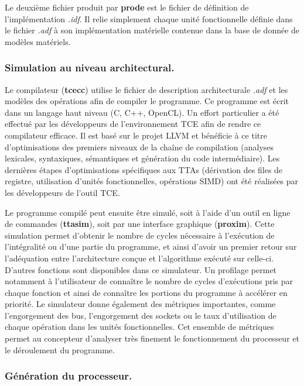 Le deuxième fichier produit par \textbf{prode} est le fichier de définition de l'implémentation \textit{.idf}. Il relie simplement chaque unité fonctionnelle définie dans le fichier \textit{.adf} à son implémentation matérielle contenue dans la base de donnée de modèles matériels.

\subsubsection{Simulation au niveau architectural.}

Le compilateur (\textbf{tcecc}) utilise le fichier de description architecturale \textit{.adf} et les modèles des opérations afin de compiler le programme. Ce programme est écrit dans un langage haut niveau (C, C++, OpenCL). Un effort particulier a été effectué par les développeurs de l'environnement TCE afin de rendre ce compilateur efficace. Il est basé sur le projet LLVM \cite{lattner_llvm:_2004} et bénéficie à ce titre d'optimisations des premiers niveaux de la chaîne de compilation (analyses lexicales, syntaxiques, sémantiques et génération du code intermédiaire). Les dernières étapes d'optimisations spécifiques aux TTAs (dérivation des files de registre, utilisation d'unités fonctionnelles, opérations SIMD) ont été réalisées par les développeurs de l'outil TCE.

Le programme compilé peut ensuite être simulé, soit à l'aide d'un outil en ligne de commandes (\textbf{ttasim}), soit par une interface graphique (\textbf{proxim}). Cette simulation permet d'obtenir le nombre de cycles nécessaire à l'exécution de l'intégralité ou d'une partie du programme, et ainsi d'avoir un premier retour sur l'adéquation entre l'architecture conçue et l'algorithme exécuté sur celle-ci. D'autres fonctions sont disponibles dans ce simulateur. Un profilage permet notamment à l'utilisateur de connaître le nombre de cycles d'exécutions pris par chaque fonction et ainsi de connaître les portions du programme à accélérer en priorité. Le simulateur donne également des métriques importantes, comme l'engorgement des bus, l'engorgement des sockets ou le taux d'utilisation de chaque opération dans les unités fonctionnelles. Cet ensemble de métriques permet au concepteur d'analyser très finement le fonctionnement du processeur et le déroulement du programme.

\subsubsection{Génération du processeur.}

